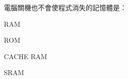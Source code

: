 \ifx\ntpcNinetyTwo\undefined[92學年基北區] \fi
電腦關機也不會使程式消失的記憶體是：
  \begin{optionlist}
  \item RAM
  \item ROM\label{ntpc-92-a23}
  \item CACHE RAM
  \item SRAM
  \end{optionlist}